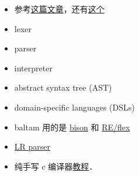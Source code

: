
\begin{issues}
\issueDraft
\end{issues}

\begin{itemize}
\item 参考\href{https://www.toptal.com/scala/writing-an-interpreter}{这篇文章}，还有\href{https://www.youtube.com/watch?v=Xu4RtLlm42I}{这个}

\item lexer
\item parser
\item interpreter
\item abstract syntax tree (AST)
\item domain-specific languages (DSLs)
\item baltam 用的是 \href{https://www.gnu.org/software/bison/}{bison} 和 \href{https://www.genivia.com/doc/reflex/html/}{RE/flex}
\item \href{https://en.wikipedia.org/wiki/LR_parser}{LR parser}
\item 纯手写 c 编译器\href{https://norasandler.com/2017/11/29/Write-a-Compiler.html}{教程}．
\end{itemize}
